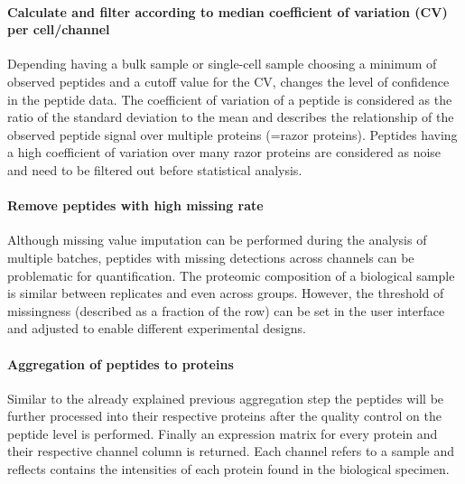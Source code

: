 \documentclass[
]{article}
\begin{document}
\hypertarget{calculate-and-filter-according-to-median-coefficient-of-variation-cv-per-cellchannel}{%
\paragraph{Calculate and filter according to median coefficient of
variation (CV) per
cell/channel}\label{calculate-and-filter-according-to-median-coefficient-of-variation-cv-per-cellchannel}}

Depending having a bulk sample or single-cell sample choosing a minimum
of observed peptides and a cutoff value for the CV, changes the level of
confidence in the peptide data. The coefficient of variation of a
peptide is considered as the ratio of the standard deviation to the mean
and describes the relationship of the observed peptide signal over
multiple proteins (=razor proteins). Peptides having a high coefficient
of variation over many razor proteins are considered as noise and need
to be filtered out before statistical analysis.

\hypertarget{remove-peptides-with-high-missing-rate}{%
\paragraph{Remove peptides with high missing
rate}\label{remove-peptides-with-high-missing-rate}}

Although missing value imputation can be performed during the analysis
of multiple batches, peptides with missing detections across channels
can be problematic for quantification. The proteomic composition of a
biological sample is similar between replicates and even across groups.
However, the threshold of missingness (described as a fraction of the
row) can be set in the user interface and adjusted to enable different
experimental designs.

\hypertarget{aggregation-of-peptides-to-proteins}{%
\paragraph{Aggregation of peptides to
proteins}\label{aggregation-of-peptides-to-proteins}}

Similar to the already explained previous aggregation step the peptides
will be further processed into their respective proteins after the
quality control on the peptide level is performed. Finally an expression
matrix for every protein and their respective channel column is
returned. Each channel refers to a sample and reflects contains the
intensities of each protein found in the biological specimen.
\end{document}
